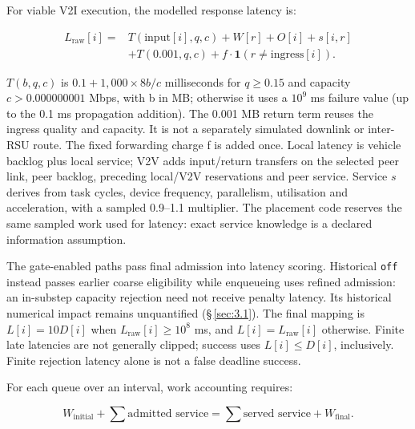 \documentclass[11pt,a4paper]{article}
\begin{document}
For viable V2I execution, the modelled response latency is:

\begin{equation}\label{eq:4}
 \begin{aligned}
 L_{\mathrm{raw}}[i]={}&T(\mathrm{input}[i],q,c)+W[r]+O[i]+s[i,r]\\
 &+T(0.001,q,c)+f\cdot\mathbf{1}(r\neq\mathrm{ingress}[i]).
 \end{aligned}
\end{equation}

$T(b,q,c)$ is $0.1 + 1{,}000 \times 8b/c$ milliseconds for $q\geq 0.15$ and capacity $c>0.000000001$ Mbps, with b in MB; otherwise it uses a $10^{9}$ ms failure value (up to the 0.1 ms propagation addition). The 0.001 MB return term reuses the ingress quality and capacity. It is not a separately simulated downlink or inter-RSU route. The fixed forwarding charge f is added once. Local latency is vehicle backlog plus local service; V2V adds input/return transfers on the selected peer link, peer backlog, preceding local/V2V reservations and peer service. Service $s$ derives from task cycles, device frequency, parallelism, utilisation and acceleration, with a sampled 0.9--1.1 multiplier. The placement code reserves the same sampled work used for latency: exact service knowledge is a declared information assumption.

The gate-enabled paths pass final admission into latency scoring. Historical \texttt{off} instead passes earlier coarse eligibility while enqueueing uses refined admission: an in-substep capacity rejection need not receive penalty latency. Its historical numerical impact remains unquantified (\S\,\ref{sec:3.1}). The final mapping is $L[i]=10D[i]$ when $L_{\mathrm{raw}}[i]\geq 10^{8}$ ms, and $L[i]=L_{\mathrm{raw}}[i]$ otherwise. Finite late latencies are not generally clipped; success uses $L[i]\leq D[i]$, inclusively. Finite rejection latency alone is not a false deadline success.

For each queue over an interval, work accounting requires:

\begin{equation}\label{eq:5}
 W_{\mathrm{initial}}+\sum\text{admitted service}
 =\sum\text{served service}+W_{\mathrm{final}}.
\end{equation}
\end{document}
